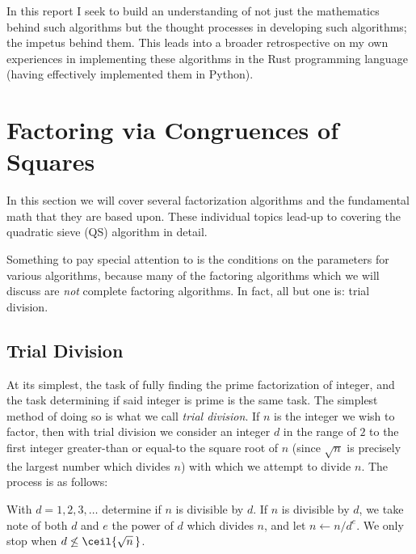 \documentclass{report}
\begin{document}
In this report I seek to build an understanding of not just the mathematics behind such algorithms
but the thought processes in developing such algorithms; the impetus behind them. This leads into
a broader retrospective on my own experiences in implementing these algorithms in the Rust
programming language (having effectively implemented them in Python).

\pagebreak

\chapter{Factoring via Congruences of Squares}

In this section we will cover several factorization algorithms and the fundamental math that they
are based upon. These individual topics lead-up to covering the quadratic sieve (QS) algorithm
in detail.

Something to pay special attention to is the conditions on the parameters for various algorithms,
because many of the factoring algorithms which we will discuss are \emph{not} complete factoring
algorithms. In fact, all but one is: trial division.

\section{Trial Division}
At its simplest, the task of fully finding the prime factorization of integer, and the task
determining if said integer is prime is the same task. The simplest method of doing so is what we
call \emph{trial division}.
If $n$ is the integer we wish to factor, then with trial division we consider an integer $d$ in the 
range of $2$ to the first integer greater-than or equal-to the square root of $n$ (since $\sqrt n$ is
precisely the largest number which divides $n$) with which we attempt to divide $n$.
The process is as follows:

With $d=1,2,3,\ldots$ determine if $n$ is divisible by $d$. If $n$ is divisible by $d$, we take note
of both $d$ and $e$ the power of $d$ which divides $n$, and let $n \gets n/d^e$. We only stop when
$d\not\le\ceil{\sqrt n\,}$.
\end{document}
